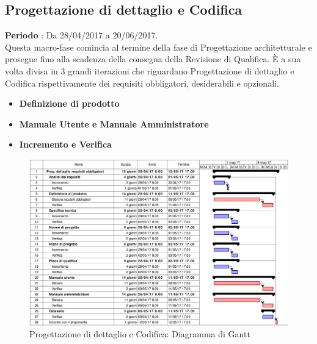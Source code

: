 \documentclass[../PianoDiProgetto.tex]{subfiles}
\begin{document}
		
		
		\subsection{Progettazione di dettaglio e Codifica}
		\textbf{Periodo} : Da 28/04/2017 a 20/06/2017. \\
		Questa macro-fase comincia al termine della fase di Progettazione architetturale e prosegue fino alla scadenza della consegna della Revisione di Qualifica.
		È a sua volta divisa in 3 grandi iterazioni che riguardano Progettazione di dettaglio e Codifica rispettivamente dei requisiti obbligatori, desiderabili e opzionali.
		\begin{itemize}
			\item \textbf{Definizione di prodotto}
			\item \textbf{Manuale Utente e Manuale Amministratore}
			\item \textbf{Incremento e Verifica}
		\end{itemize}
		\begin{figure}[H]
			\centering
			\includegraphics[scale=0.55]{Figures/Gantt_DettaglioObbligatori}
			\caption{Progettazione di dettaglio e Codifica: Diagramma di Gantt}
		\end{figure}
\end{document}
